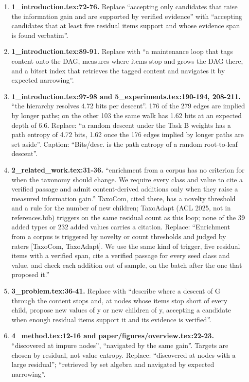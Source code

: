 \documentclass[10pt,a4paper]{article}
\begin{document}
{\begin{enumerate}[leftmargin=1.8em,itemsep=0.45em]
\item \textbf{1\_introduction.tex:72-76.} Replace ``accepting only candidates that raise the information gain and are supported by verified evidence'' with ``accepting candidates that at least five residual items support and whose evidence span is found verbatim''.
\item \textbf{1\_introduction.tex:89-91.} Replace with ``a maintenance loop that tags content onto the DAG, measures where items stop and grows the DAG there, and a bitset index that retrieves the tagged content and navigates it by expected narrowing''.
\item \textbf{1\_introduction.tex:97-98 and 5\_experiments.tex:190-194, 208-211.} ``the hierarchy resolves 4.72 bits per descent''. 176 of the 279 edges are implied by longer paths; on the other 103 the same walk has 1.62 bits at an expected depth of 6.6. Replace: ``a random descent under the Task B weights has a path entropy of 4.72 bits, 1.62 once the 176 edges implied by longer paths are set aside''. Caption: ``Bits/desc. is the path entropy of a random root-to-leaf descent''.
\item \textbf{2\_related\_work.tex:31-36.} ``enrichment from a corpus has no criterion for when the taxonomy should change. We require every class and value to cite a verified passage and admit content-derived additions only when they raise a measured information gain.'' TaxoCom, cited there, has a novelty threshold and a rule for the number of new children; TaxoAdapt (ACL 2025, not in references.bib) triggers on the same residual count as this loop; none of the 39 added types or 232 added values carries a citation. Replace: ``Enrichment from a corpus is triggered by novelty or count thresholds and judged by raters [TaxoCom, TaxoAdapt]. We use the same kind of trigger, five residual items with a verified span, cite a verified passage for every seed class and value, and check each addition out of sample, on the batch after the one that proposed it.''
\item \textbf{3\_problem.tex:36-41.} Replace with ``describe where a descent of G through the content stops and, at nodes whose items stop short of every child, propose new values of y or new children of y, accepting a candidate when enough residual items support it and its evidence is verified''.
\item \textbf{4\_method.tex:12-16 and paper/figures/overview.tex:22-23.} ``discovered at impure nodes'', ``navigated by the same gain''. Targets are chosen by residual, not value entropy. Replace: ``discovered at nodes with a large residual''; ``retrieved by set algebra and navigated by expected narrowing''.

\end{enumerate}}
\end{document}
